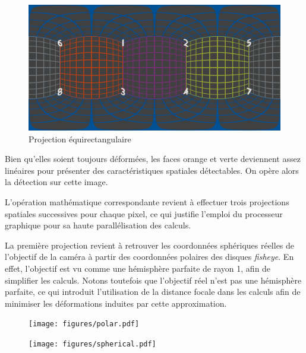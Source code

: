 			\begin{figure}[H]
			{
				\centering
				\includegraphics[width=1\textwidth]{figures/equirect.png}
				\caption{Projection équirectangulaire}
				\label{fig:equirect}
			}
			\end{figure}
			Bien qu'elles soient toujours déformées, les faces orange et verte deviennent assez linéaires pour présenter des caractéristiques spatiales détectables. On opère alors la détection sur cette image.
			\par
			L'opération mathématique correspondante revient à effectuer trois projections spatiales successives pour chaque pixel, ce qui justifie l'emploi du processeur graphique pour sa haute parallélisation des calculs.
			\par
			La première projection revient à retrouver les coordonnées sphériques réelles de l'objectif de la caméra à partir des coordonnées polaires des disques \emph{fisheye}. En effet, l'objectif est vu comme une hémisphère parfaite de rayon 1, afin de simplifier les calculs. Notons toutefois que l'objectif réel n'est pas une hémisphère parfaite, ce qui introduit l'utilisation de la distance focale dans les calculs afin de minimiser les déformations induites par cette approximation.
			\begin{figure}[htb]
				\centering
				\begin{minipage}{.5\textwidth}
					\centering
					\texttt{[image: figures/polar.pdf]}
					\label{fig:pcart1}
				\end{minipage}%
				\begin{minipage}{.5\textwidth}
					\centering
					\texttt{[image: figures/spherical.pdf]}
					\label{fig:psph}
				\end{minipage}
			\end{figure}
